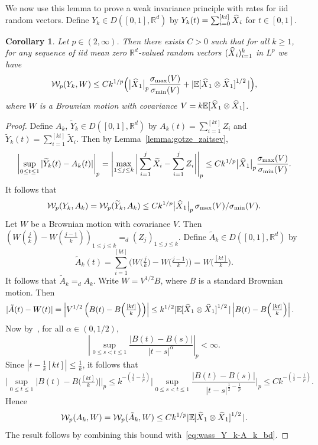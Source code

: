 \documentclass[11pt,a4paper,reqno,oneside]{amsart}
\newcommand{\R}{\ensuremath{\mathbb{R}}}%
\newcommand{\pnorm}[1]{\left|#1\right|}
\newcommand{\eqd}{=_d}
\newcommand{\Ex}[2][]{\mathbb{E}_{#1\!\!}\left[#2\right]}
\newcommand{\wass}{\mathcal{W}}
\newcommand{\shat}[1]{\vphantom{#1}\smash[t]{\widehat{#1}}}
\newtheorem{corol}[theorem]{Corollary}
\theoremstyle{definition}
\theoremstyle{remark}
\numberwithin{equation}{section}
\begin{document}
	We now use this lemma to prove a weak invariance principle with rates for iid random vectors. Define $ Y_k \in D([0,1],\R^d) $ by $ Y_k(t)=\sum_{i=0}^{[kt]}\shat X_i $ for $ t\in [0,1] $.
	\begin{corol}\label{corol:wip_rates_iid}
		Let $ p\in(2,\infty) $. Then there exists $ C>0 $ such that for all $ k\ge 1 $, for any sequence of iid mean zero $\R^d$-valued random vectors $ (\shat X_i)_{i=1}^k $ in $ L^p $ we have 
		\[ \wass_p(Y_k, W)\le Ck^{1/p}\Big(\big|\shat X_1\big|_p\frac{\sigma_{\max}(V)}{\sigma_{\min}(V)}+|\Ex{\shat X_1 \otimes \shat X_1}^{1/2}|\Big), \]
		where $ W $ is a Brownian motion with covariance $ V=k\mathbb{E}[\shat X_1 \otimes \shat X_1] $.
	\end{corol}
	\begin{proof}
		Define $ A_k,\, \widetilde Y_k \in D([0,1],\R^d) $ by $ A_k(t) = \sum_{i=1}^{[kt]}Z_i $ and $ \widetilde Y_k(t)=\sum_{i=1}^{[kt]}\widetilde X_i $. Then by Lemma~\ref{lemma:gotze_zaitsev},
		\[ \pnorm{\sup_{0\le t\le 1}|\widetilde Y_k(t)-A_k(t)|}_p=\pnorm{\max_{1\le j \le k}\bigg|\sum_{i=1}^j \widetilde X_i-\sum_{i=1}^j Z_i  \bigg|}_p\le Ck^{1/p}\big|\shat X_1\big|_p\frac{\sigma_{\max}(V)}{\sigma_{\min}(V)}. \]
		It follows that 
		\begin{equation}\label{eq:wass_Y_k-A_k_bd}
			\wass_p(Y_k,A_k)=\wass_p(\widetilde Y_k,A_k)\le Ck^{1/p}\big|\shat X_1\big|_p \, \sigma_{\max}(V)/\sigma_{\min}(V).
		\end{equation} 
		Let $ W $ be a Brownian motion with covariance $ V$. Then 
		\( (W(\frac{j}{k}) - W(\frac{j-1}{k}))_{1 \le j \le k} \eqd (Z_j)_{1 \le j \le k}.\)
		Define $ \tilde A_k\in D([0,1],\R^d) $ by 
		\[ \tilde A_k(t)=\sum_{i=1}^{[kt]}\Big(W\big(\tfrac{j}{k}\big)-W\big(\tfrac{j-1}{k}\big)\Big)=W\Big(\tfrac{[kt]}{k}\Big). \] 
		It follows that $ \tilde A_k \eqd A_k $. Write $ W=V^{1/2}B $, where $ B $ is a standard Brownian motion. Then 
		\begin{align*}
			|\tilde A(t)-W(t)|&=\left|V^{1/2}\left(B(t)-B\Big(\tfrac{[kt]}{k}\Big)\right)\right|\le k^{1/2}|\Ex{\shat X_1\otimes \shat X_1}^{1/2}|\left|B(t)-B\Big(\tfrac{[kt]}{k}\Big)\right|.
		\end{align*}
		Now by~\cite[Theorem 2.1 and p.\ 28]{revuz_yor}, for all $\alpha\in (0,1/2)$,
		\[ \pnorm{\sup_{0\le s<t\le 1}\frac{|B(t)-B(s)|}{|t-s|^{\alpha}}}_p<\infty. \]
		Since $ |t-\frac{1}{k}[kt]|\le \frac{1}{k} $, it follows that
		\[ \Bigg|\sup_{0\le t\le 1}\Big|B(t)-B\Big(\tfrac{[kt]}{k}\Big)\Big|\Bigg|_p\le k^{-(\frac{1}{2}-\frac{1}{p})}\bigg|\sup_{0\le s<t\le 1}\frac{|B(t)-B(s)|}{|t-s|^{\frac{1}{2}-\frac{1}{p}}}\bigg|_p \le Ck^{-(\frac{1}{2}-\frac{1}{p})}. \]
		Hence 
		\[ \wass_p(A_k, W)=\wass_p(\tilde A_k, W)\le Ck^{1/p}|\Ex{\shat X_1\otimes \shat X_1}^{1/2}|. \]
		The result follows by combining this bound with~\eqref{eq:wass_Y_k-A_k_bd}.
	\end{proof}
\end{document}
